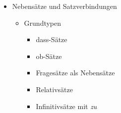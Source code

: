 \documentclass[a4paper]{article}
\begin{document}
\begin{itemize}
\begin{itemize}
                \item Satzarten
                \begin{itemize}
                    \item Aussagesatz
                    \item Fragesatz
                    \item Aufforderungssatz
                    \item Wunschsatz
                    \item Ausrufesatz
                \end{itemize}
                
                \item Satzglieder
                \begin{itemize}
                    \item Prädikat
                    \item Subjekt
                    \item Akkusativobjekt
                    \item Dativobjekt
                    \item Präpositionalobjekt
                    \item Adverbiale
                \end{itemize}
                
                \item Negation
                \begin{itemize}
                    \item \textit{nicht}
                    \item \textit{kein}
                    \item pauschale Negation
                    \item Negationswörter
                \end{itemize}
            \end{itemize}
            
            \item Nebensätze und Satzverbindungen
            \begin{itemize}
                \item Grundtypen
                \begin{itemize}
                    \item dass-Sätze
                    \item ob-Sätze
                    \item Fragesätze als Nebensätze
                    \item Relativsätze
                    \item Infinitivsätze mit \textit{zu}
                \end{itemize}
                

\end{itemize}
\end{itemize}
\end{document}
